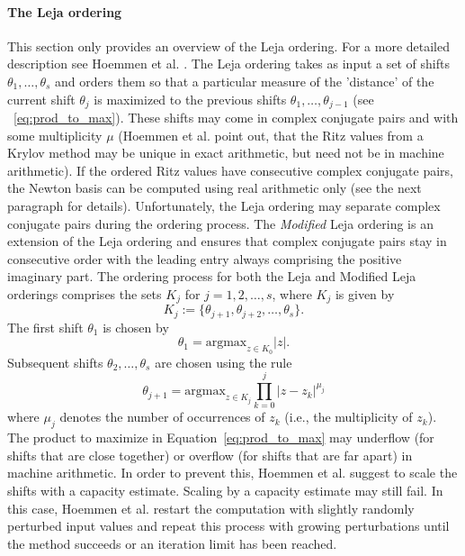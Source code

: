 \documentclass{scrartcl}
\numberwithin{equation}{section}
\begin{document}

\paragraph{The Leja ordering}
This section only provides an overview of the Leja ordering. For a more detailed description see Hoemmen et al. \cite{Hoemmen:2010:CKS:1970638}.
 The Leja ordering takes as input a set of shifts $\theta_1, \ldots, \theta_s$ and orders them so that a particular measure of the 'distance' of the current shift $\theta_j$ is maximized to the previous shifts $\theta_1, \ldots, \theta_{j - 1}$ (see ~\eqref{eq:prod_to_max}). These shifts may come in complex conjugate pairs and with some multiplicity $\mu$ (Hoemmen et al. \cite{Hoemmen:2010:CKS:1970638} point out, that the Ritz values from a Krylov method may be unique in exact arithmetic, but need not be in machine arithmetic). If the ordered Ritz values have consecutive complex conjugate pairs, the Newton basis can be computed using real arithmetic only (see the next paragraph for details). Unfortunately, the Leja ordering may separate complex conjugate pairs during the ordering process. The \textit{Modified} Leja ordering is an extension of the Leja ordering and ensures that complex conjugate pairs stay in consecutive order with the leading entry always comprising the positive imaginary part. The ordering process for both the Leja and Modified Leja orderings comprises the sets $K_j$ for $j = 1,2, \ldots, s$, where $K_j$ is given by
\begin{equation}
K_j := \{\theta_{j + 1}, \theta_{j + 2}, \ldots, \theta_s\}.
\end{equation}
The first shift $\theta_1$ is chosen by
\begin{equation}
\theta_1 = \text{argmax}_{z \in K_0} |z|.
\end{equation}
Subsequent shifts $\theta_2, \ldots, \theta_s$ are chosen using the rule
\begin{equation}\label{eq:prod_to_max}
\theta_{j + 1} = \text{argmax}_{z \in K_j} \prod_{k = 0}^j |z - z_k|^{\mu_j}
\end{equation}
where $\mu_j$ denotes the number of occurrences of $z_k$ (i.e., the multiplicity of $z_k$).
The product to maximize in Equation~\eqref{eq:prod_to_max} may underflow (for shifts that are close together) or overflow (for shifts that are far apart) in machine arithmetic. In order to prevent this, Hoemmen et al. \cite{Hoemmen:2010:CKS:1970638} suggest to scale the shifts with a capacity estimate. Scaling by a capacity estimate may still fail. In this case, Hoemmen et al. restart the computation with slightly randomly perturbed input values and repeat this process with growing perturbations until the method succeeds or an iteration limit has been reached.
\end{document}

